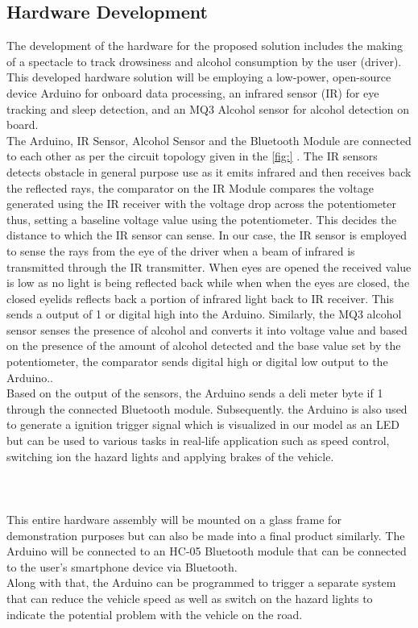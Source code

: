 \documentclass[12pt]{article}
\begin{document}
\subsection{Hardware Development}
The development of the hardware for the proposed solution includes the making of a spectacle to track drowsiness and alcohol consumption by the user (driver). This developed hardware solution will be employing a low-power, open-source device Arduino for onboard data processing, an infrared sensor (IR) for eye tracking and sleep detection, and an MQ3 Alcohol sensor for alcohol detection on board. 
\\
The Arduino, IR Sensor, Alcohol Sensor and the Bluetooth Module are connected to each other as per the circuit topology given in the \ref{fig:} . The IR sensors detects obstacle in general purpose use as it emits infrared and then receives back the reflected rays, the comparator on the IR Module compares the voltage generated using the IR receiver with the voltage drop across the potentiometer thus, setting a baseline voltage value using the potentiometer. This decides the distance to which the IR sensor can sense. In our case, the IR sensor is employed to sense the rays from the eye of the driver when a beam of infrared is transmitted through the IR transmitter. When eyes are opened the received value is low as no light is being reflected back while when when the eyes are closed, the closed eyelids reflects back a portion of infrared light back to IR receiver. This sends a output of 1 or digital high into the Arduino. Similarly, the MQ3 alcohol sensor senses the presence of alcohol and converts it into voltage value and based on the presence of the amount of alcohol detected and the base value set by the potentiometer, the comparator sends digital high or digital low output to the Arduino..
\\
Based on the output of the sensors, the Arduino sends a deli meter byte if 1 through the connected Bluetooth module. Subsequently. the Arduino is also used to generate a ignition trigger signal which is visualized in our model as an LED but can be used to various tasks in real-life application such as speed control, switching ion the hazard lights and applying brakes of the vehicle. 
\\
\\
\\
\\
This entire hardware assembly will be mounted on a glass frame for demonstration purposes but can also be made into a final product similarly. The Arduino will be connected to an HC-05 Bluetooth module that can be connected to the user's smartphone device via Bluetooth. 
\\
Along with that, the Arduino can be programmed to trigger a separate system that can reduce the vehicle speed as well as switch on the hazard lights to indicate the potential problem with the vehicle on the road. 
\\
\\
\end{document}
